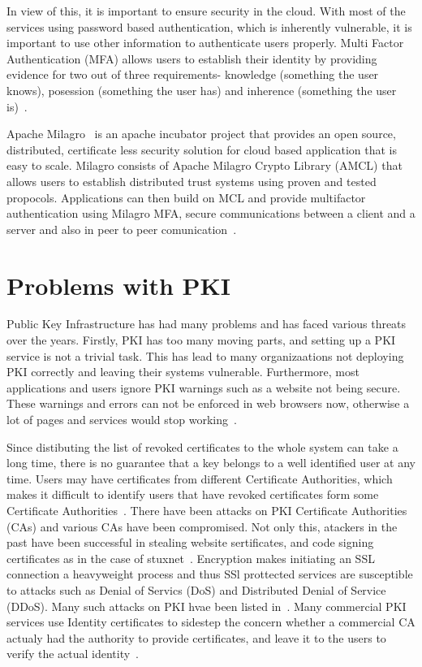In view of this, it is important to ensure security in the cloud. With
most of the services using password based authentication, which is
inherently vulnerable, it is important to use other information to
authenticate users properly. Multi Factor Authentication (MFA) allows
users to establish their identity by providing evidence for two out of
three requirements- knowledge (something the user knows), posession
(something the user has) and inherence (something the user
is)~\cite{centrify-mfa}.

Apache Milagro~\cite{milagro-website} is an apache incubator project
that provides an open source, distributed, certificate less security
solution for cloud based application that is easy to scale. Milagro
consists of Apache Milagro Crypto Library (AMCL) that allows users to
establish distributed trust systems using proven and tested
propocols. Applications can then build on MCL and provide multifactor
authentication using Milagro MFA, secure communications between a
client and a server and also in peer to peer
comunication~\cite{milagro-docs-overview}.



\section{Problems with PKI}
Public Key Infrastructure has had many problems and has faced various
threats over the years.  Firstly, PKI has too many moving parts, and
setting up a PKI service is not a trivial task. This has lead to many
organizaations not deploying PKI correctly and leaving their systems
vulnerable. Furthermore, most applications and users ignore PKI
warnings such as a website not being secure. These warnings and errors
can not be enforced in web browsers now, otherwise a lot of pages and
services would stop working~\cite{cso-pki-problems}.

Since distibuting the list of revoked certificates to the whole system
can take a long time, there is no guarantee that a key belongs to a
well identified user at any time. Users may have certificates from
different Certificate Authorities, which makes it difficult to
identify users that have revoked certificates form some Certificate
Authorities~\cite{distlab-pki-problems}.  There have been attacks on
PKI Certificate Authorities (CAs) and various CAs have been
compromised. Not only this, atackers in the past have been successful
in stealing website sertificates, and code signing certificates as in
the case of stuxnet~\cite{securityweek-ssl-threats}. Encryption makes
initiating an SSL connection a heavyweight process and thus SSl
prottected services are susceptible to attacks such as Denial of
Servics (DoS) and Distributed Denial of Service (DDoS). Many such
attacks on PKI hvae been listed in~\cite{cacert-wiki-pki-history}.
Many commercial PKI services use Identity certificates to sidestep the
concern whether a commercial CA actualy had the authority to provide
certificates, and leave it to the users to verify the actual
identity~\cite{ten-pki-risks}.

